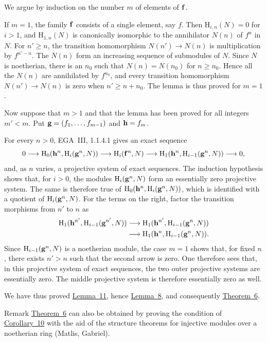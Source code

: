 \begin{sgaproof}
We argue by induction on the number $m$ of elements of $\mathbf f$.

If $m=1$, the family $\mathbf f$ consists of a single element, say $f$.
Then $\mathrm H_{i,n}(N)=0$ for $i>1$, and $\mathrm H_{1,n}(N)$ is
canonically isomorphic to the annihilator $N(n)$ of $f^n$ in $N$. For
$n'\geq n$, the transition homomorphism $N(n')\to N(n)$ is multiplication
by $f^{n'-n}$. The $N(n)$ form an increasing sequence of submodules of $N$.
Since $N$ is noetherian, there is an $n_0$ such that
$N(n)=N(n_0)$ for $n\geq n_0$. Hence all the $N(n)$ are annihilated by
$f^{n_0}$, and every transition homomorphism $N(n')\to N(n)$ is zero when
$n'\geq n+n_0$. The lemma is thus proved for $m=1$.

Now suppose that $m>1$ and that the lemma has been proved for all integers
$m'<m$. Put
$\mathbf g=(f_1,\ldots,f_{m-1})$ and $\mathbf h=f_m$.

For every $n>0$, EGA~III, 1.1.4.1 gives an exact sequence
\[
  0\longrightarrow
  \mathrm H_0(\mathbf h^n,\mathrm H_i(\mathbf g^n,N))
  \longrightarrow \mathrm H_i(\mathbf f^n,N)
  \longrightarrow
  \mathrm H_1(\mathbf h^n,\mathrm H_{i-1}(\mathbf g^n,N))
  \longrightarrow0,
\]
and, as $n$ varies, a projective system of exact sequences. The induction
hypothesis shows that, for $i>0$, the modules
$\mathrm H_i(\mathbf g^n,N)$ form an essentially zero projective system. The same
is therefore true of
$\mathrm H_0(\mathbf h^n,\mathrm H_i(\mathbf g^n,N))$, which is identified with a
quotient of $\mathrm H_i(\mathbf g^n,N)$. For the terms on the right, factor the
transition morphisms from $n'$ to $n$ as
\[
\begin{split}
  \mathrm H_1(\mathbf h^{n'},\mathrm H_{i-1}(\mathbf g^{n'},N))
  &\longrightarrow
  \mathrm H_1(\mathbf h^{n'},\mathrm H_{i-1}(\mathbf g^n,N)) \\
  &\longrightarrow
  \mathrm H_1(\mathbf h^n,\mathrm H_{i-1}(\mathbf g^n,N)).
\end{split}
\]
Since $\mathrm H_{i-1}(\mathbf g^n,N)$ is a noetherian module, the case $m=1$
shows that, for fixed $n$, there exists $n'>n$ such that the second arrow is
zero. One therefore sees that, in this projective system of exact
sequences, the two outer projective systems are essentially zero. The middle
projective system is therefore essentially zero as well.
\end{sgaproof}

We have thus proved \hyperref[II.11]{Lemma~11}, hence \hyperref[II.8]{Lemma~8}, and consequently \hyperref[II.6]{Theorem~6}.

\begin{sgaremark}{Remark}
\hyperref[II.6]{Theorem~6} can also be obtained by proving the condition of \hyperref[II.10]{Corollary~10} with
the aid of the structure theorems for injective modules over a noetherian
ring (Matlis, Gabriel).
\end{sgaremark}
